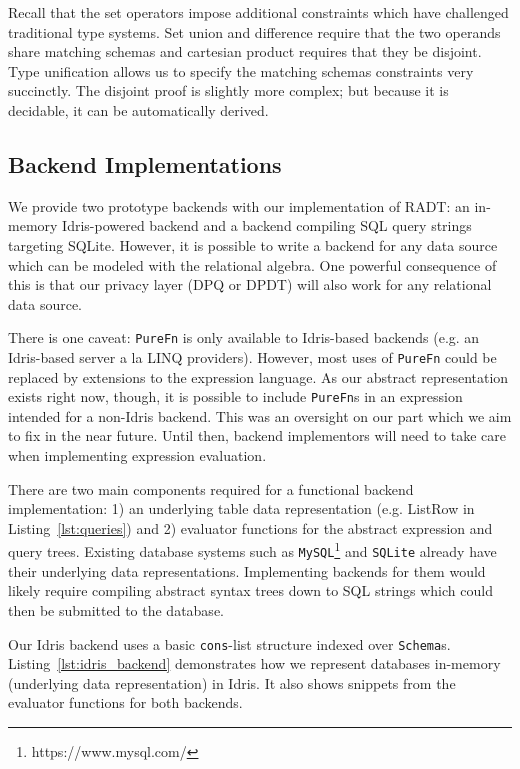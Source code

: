 \documentclass[12pt]{report}
\begin{document}
Recall that the set operators impose additional constraints which have challenged traditional type systems.
Set union and difference require that the two operands share matching schemas and cartesian product requires that they be disjoint.
Type unification allows us to specify the matching schemas constraints very succinctly.
The disjoint proof is slightly more complex; but because it is decidable, it can be automatically derived.

\subsection{Backend Implementations}

We provide two prototype backends with our implementation of RADT: an in-memory Idris-powered backend and a backend compiling SQL query strings targeting SQLite.
However, it is possible to write a backend for any data source which can be modeled with the relational algebra.
One powerful consequence of this is that our privacy layer (DPQ or DPDT) will also work for any relational data source.

There is one caveat: \texttt{PureFn} is only available to Idris-based backends (e.g. an Idris-based server a la LINQ providers).
However, most uses of \texttt{PureFn} could be replaced by extensions to the expression language.
As our abstract representation exists right now, though, it is possible to include \texttt{PureFn}s in an expression intended for a non-Idris backend.
This was an oversight on our part which we aim to fix in the near future.
Until then, backend implementors will need to take care when implementing expression evaluation.

There are two main components required for a functional backend implementation:
1) an underlying table data representation (e.g. ListRow in Listing~\ref{lst:queries}) and
2) evaluator functions for the abstract expression and query trees.
Existing database systems such as \texttt{MySQL}\footnote{https://www.mysql.com/} and \texttt{SQLite} already have their underlying data representations.
Implementing backends for them would likely require compiling abstract syntax trees down to SQL strings which could then be submitted to the database.

Our Idris backend uses a basic \texttt{cons}-list structure indexed over \texttt{Schema}s.
Listing~\ref{lst:idris_backend} demonstrates how we represent databases in-memory (underlying data representation) in Idris.
It also shows snippets from the evaluator functions for both backends.
\end{document}
